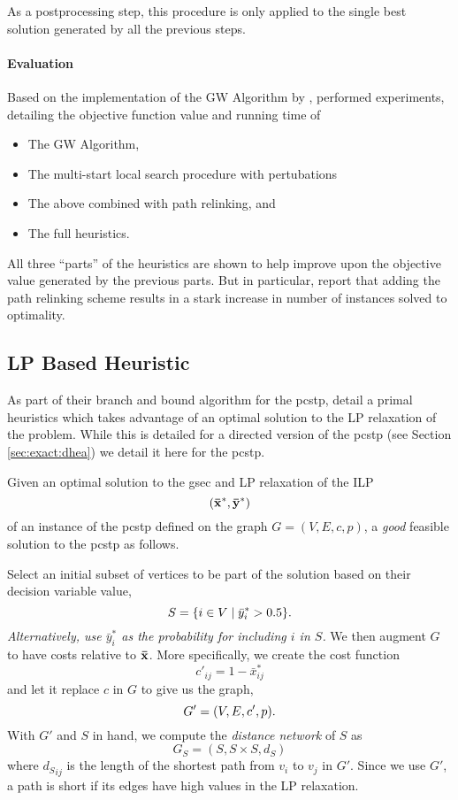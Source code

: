  As a postprocessing step, this procedure is only applied to the single best solution generated
  by all the previous steps.
\paragraph{Evaluation}
Based on the implementation of the GW Algorithm by \citet{Johnson:2000:PCS:338219.338637},
\citet{canuto2001local} performed experiments, detailing the objective function value
and running time of
\begin{itemize}
\item The GW Algorithm,
\item The multi-start local search procedure with pertubations
\item The above combined with path relinking, and
\item The full heuristics.
\end{itemize}

All three ``parts'' of the heuristics are shown to help improve upon the
objective value generated by the previous parts.
But in particular, \citeauthor{canuto2001local} report that adding the
path relinking scheme results in a stark increase
 in number of instances solved to optimality.

 \subsection{LP Based Heuristic}
 \label{sec:heuristics:lp}
 As part of their branch and bound algorithm for the \gls{pcstp}, \cite{ljubic2005solving} detail a primal
 heuristics which takes advantage of an optimal solution to the LP relaxation of the problem. While this
 is detailed for a directed version of the \gls{pcstp} (see Section \ref{sec:exact:dhea}) we detail it
 here for the \gls{pcstp}.
 
 Given an optimal solution to the \gls{gsec} and LP relaxation of the ILP
 $$(\mathbf{ \bar x^*}, \mathbf{\bar y^*})$$
 of an instance of the \gls{pcstp} defined on the graph $G = (V, E, c, p)$,
 a \textit{good} feasible solution to the \gls{pcstp} as follows.

 Select an initial subset of vertices to be part of the solution based on their decision variable value,
 $$S = \{ i \in V \mid \bar y^*_i > 0.5 \}\mathnormal{.}$$
 \textit{Alternatively, use $\bar y^*_i$ as the probability for including $i$ in $S$.}
 We then augment $G$ to have costs relative to $\mathbf{\bar{x}}$. More specifically,
 we create the cost function
 $$c'_{ij} = 1 - \bar{x}^*_{ij}$$
 and let it replace $c$ in $G$ to give us the graph,
 $$G' = (V, E, c', p)\mathnormal{.}$$
 With $G'$ and $S$ in hand, we compute the \textit{distance network} of $S$ as
 $$G_S = (S, S \times S, d_S)$$
 where ${d_S}_{ij}$ is the length of the shortest path from $v_i$ to $v_j$ in $G'$.
 Since we use $G'$, a path is short if its edges have high values in the LP
 relaxation.

